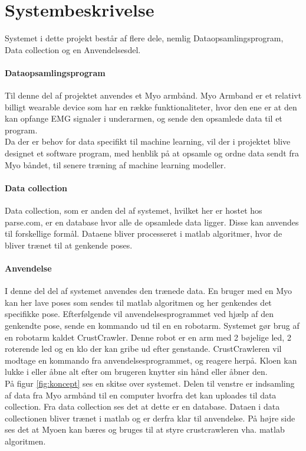 \thispagestyle{fancy}
\chapter{Systembeskrivelse}
\label{chp:systembeskrivelse}

Systemet i dette projekt består af flere dele, nemlig Dataopsamlingsprogram, Data collection og en Anvendelsesdel.
\subsubsection{Dataopsamlingsprogram}
Til denne del af projektet anvendes et Myo armbånd. Myo Armband er et relativt billigt wearable device som har en række funktionaliteter, hvor den ene er at den kan opfange EMG signaler i underarmen, og sende den opsamlede data til et program.\\
Da der er behov for data specifikt til machine learning, vil der i projektet blive designet et software program, med henblik på at opsamle og ordne data sendt fra Myo båndet, til senere træning af machine learning modeller.


\subsubsection{Data collection}
Data collection, som er anden del af systemet, hvilket her er hostet hos parse.com, er en database hvor alle de opsamlede data ligger. Disse kan anvendes til forskellige formål. Dataene bliver processeret i matlab algoritmer, hvor de bliver trænet til at genkende poses.

\subsubsection{Anvendelse}
I denne del del af systemet anvendes den trænede data. En bruger med en Myo kan her lave poses som sendes til matlab algoritmen og her genkendes det specifikke pose. Efterfølgende vil anvendelsesprogrammet ved hjælp af den genkendte pose, sende en kommando ud til en en robotarm. Systemet gør brug af en robotarm kaldet CrustCrawler. Denne robot er en arm med 2 bøjelige led, 2 roterende led og en klo der kan gribe ud efter genstande. CrustCrawleren vil modtage en kommando fra anvendelsesprogrammet, og reagere herpå. Kloen kan lukke i eller åbne alt efter om brugeren knytter sin hånd eller åbner den.\\


På figur \ref{fig:koncept} ses en skitse over systemet. Delen til venstre er indsamling af data fra Myo armbånd til en computer hvorfra det kan uploades til data collection. Fra data collection ses det at dette er en database. Dataen i data collectionen bliver trænet i matlab og er derfra klar til anvendelse. På højre side ses det at Myoen kan bæres og bruges til at styre crustcrawleren vha. matlab algoritmen.

